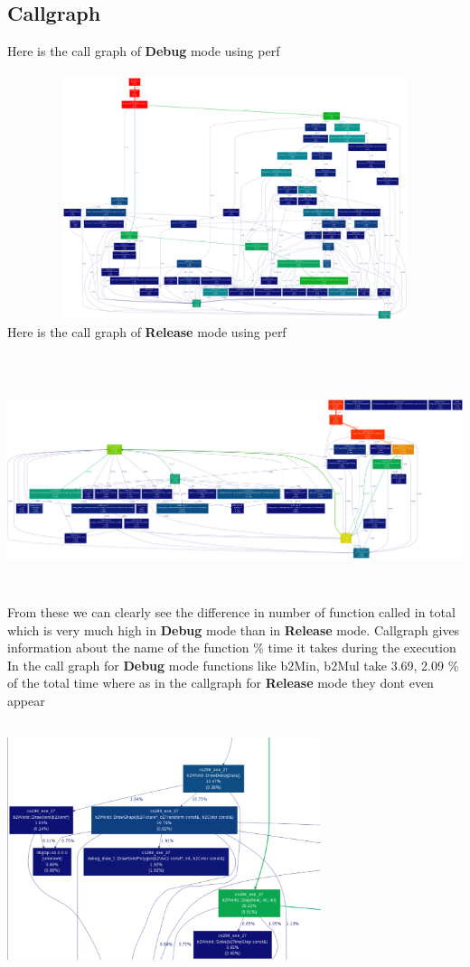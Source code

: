 \documentclass{article}
\begin{document}
\subsection{Callgraph}
Here is the call graph of \textbf{Debug} mode using perf\\\\
\includegraphics[width=560pt,height=200pt]{debug}\\
Here is the call graph of \textbf{Release} mode using perf\\\\
\includegraphics[width=560pt,height=200pt]{release}\\
From these we can clearly see the difference in number of function called in total which is very much high in 
\textbf{Debug} mode than in \textbf{Release} mode.
Callgraph gives information about the name of the function \% time it takes during the execution 
In the call graph for \textbf{Debug} mode functions like b2Min, b2Mul take 3.69, 2.09 \% of the total time where as in the callgraph for 
\textbf{Release} mode they dont even appear\\\\
\includegraphics[width=260pt,height=200pt]{debug1} \hfill
\end{document}
